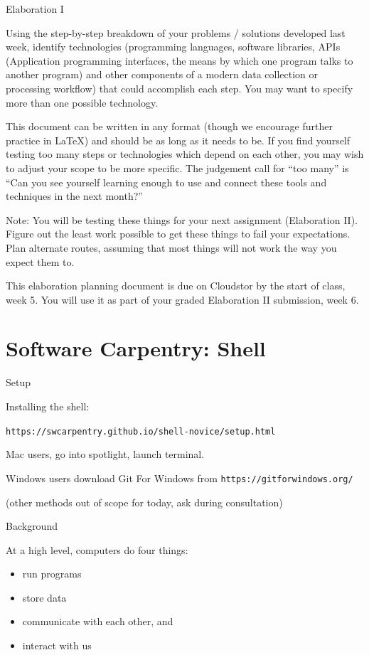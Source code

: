 \documentclass[aspectratio=1610, 11pt]{beamer} %
\begin{document}
\begin{frame}{Elaboration I}

{\small 
Using the step-by-step breakdown of your problems / solutions developed last week, identify technologies (programming languages, software libraries, APIs (Application programming interfaces, the means by which one program talks to another program) and other components of a modern data collection or processing workflow) that could accomplish each step. You may want to specify more than one possible technology. 

This document can be written in any format (though we encourage further practice in LaTeX) and should be as long as it needs to be. If you find yourself testing too many steps or technologies which depend on each other, you may wish to adjust your scope to be more specific. The judgement call for “too many” is “Can you see yourself learning enough to use and connect these tools and techniques in the next month?” 

Note: You will be testing these things for your next assignment (Elaboration II). Figure out the least work possible to get these things to fail your expectations. Plan alternate routes, assuming that most things will not work the way you expect them to. 

This elaboration planning document is due on Cloudstor by the start of class, week 5. You will use it as part of your graded Elaboration II submission, week 6.}

    
\end{frame}

\section{Software Carpentry: Shell}

\begin{frame}{Setup}

Installing the shell:

{\tt https://swcarpentry.github.io/shell-novice/setup.html}

Mac users, go into spotlight, launch terminal.

Windows users download Git For Windows from {\tt https://gitforwindows.org/}

(other methods out of scope for today, ask during consultation)
\end{frame}

\begin{frame}{Background}

At a high level, computers do four things:
\begin{itemize}[label=\textbullet]
    \item run programs
    \item store data
    \item communicate with each other, and
    \item interact with us
\end{itemize}


\end{frame}
\end{document}
